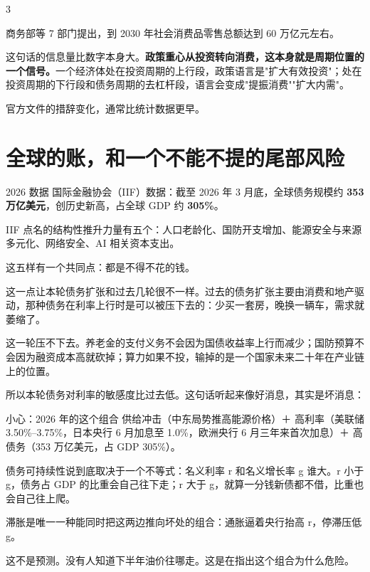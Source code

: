 \begin{statrow}{3}
\end{statrow}

商务部等 7 部门提出，到 2030 年社会消费品零售总额达到 60 万亿元左右。

这句话的信息量比数字本身大。\textbf{政策重心从投资转向消费，这本身就是周期位置的一个信号。}一个经济体处在投资周期的上行段，政策语言是"扩大有效投资"；处在投资周期的下行段和债务周期的去杠杆段，语言会变成"提振消费""扩大内需"。

官方文件的措辞变化，通常比统计数据更早。

\section{全球的账，和一个不能不提的尾部风险}

\begin{databox}{2026 数据}
国际金融协会（IIF）数据：截至 2026 年 3 月底，全球债务规模约 \textbf{353 万亿美元}，创历史新高，占全球 GDP 约 \textbf{305\%}。

IIF 点名的结构性推升力量有五个：人口老龄化、国防开支增加、能源安全与来源多元化、网络安全、AI 相关资本支出。

\end{databox}

这五样有一个共同点：都是不得不花的钱。

这一点让本轮债务扩张和过去几轮很不一样。过去的债务扩张主要由消费和地产驱动，那种债务在利率上行时是可以被压下去的：少买一套房，晚换一辆车，需求就萎缩了。

这一轮压不下去。养老金的支付义务不会因为国债收益率上行而减少；国防预算不会因为融资成本高就砍掉；算力如果不投，输掉的是一个国家未来二十年在产业链上的位置。

所以本轮债务对利率的敏感度比过去低。这句话听起来像好消息，其实是坏消息：

\begin{warnbox}{小心：2026 年的这个组合}
供给冲击（中东局势推高能源价格）＋ 高利率（美联储 3.50\%–3.75\%，日本央行 6 月加息至 1.0\%，欧洲央行 6 月三年来首次加息）＋ 高债务（353 万亿美元，占 GDP 305\%）。

债务可持续性说到底取决于一个不等式：名义利率 r 和名义增长率 g 谁大。r 小于 g，债务占 GDP 的比重会自己往下走；r 大于 g，就算一分钱新债都不借，比重也会自己往上爬。

滞胀是唯一一种能同时把这两边推向坏处的组合：通胀逼着央行抬高 r，停滞压低 g。

这不是预测。没有人知道下半年油价往哪走。这是在指出这个组合为什么危险。

\end{warnbox}

